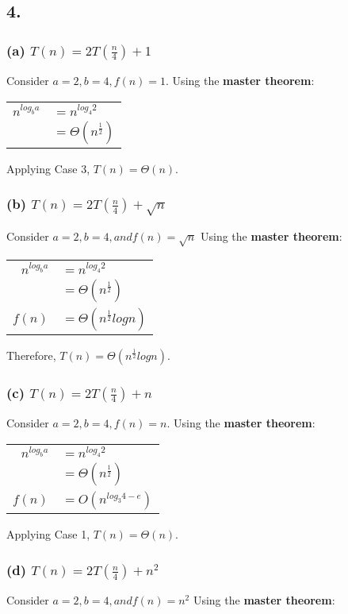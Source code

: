 \documentclass[11pt,letterpaper]{article}
\begin{document}
\subsection*{4.}
\subsubsection*{(a) $T(n) = 2T(\frac{n}{4}) + 1$}
Consider $a = 2, b = 4, f(n) = 1$. Using the \textbf{master theorem}:

\begin{tabular}{r l}
	$n^{ log_b a }$		&	$ = n^{log_4 2} $\\
					&	$ = \Theta(n^{\frac{1}{2}} ) $ \\
\end{tabular}

Applying Case 3, $T(n) = \Theta(n)$.


\subsubsection*{(b) $T(n) = 2T(\frac{n}{4}) + \sqrt{n} $}
Consider $a = 2, b = 4, and f(n) = \sqrt{n} $ Using the \textbf{master theorem}:

\begin{tabular}{r l}
	$n^{ log_b a }$		&	$ = n^{log_4 2} $\\
					&	$ = \Theta(n^{\frac{1}{2}} ) $ \\
	$f(n)$			&	$ = \Theta(n^{\frac{1}{2}} log n) $ \\
\end{tabular}

Therefore, $T(n) = \Theta(n^{\frac{1}{2}} log n) $.


\subsubsection*{(c) $T(n) = 2T(\frac{n}{4}) + n$ }
Consider $a = 2, b = 4, f(n) = n$. Using the \textbf{master theorem}:

\begin{tabular}{r l}
	$n^{ log_b a }$		&	$ = n^{log_4 2} $\\
					&	$ = \Theta(n^{\frac{1}{2}} ) $ \\
	$f(n)$			&	$ = O(n^{log_3 4 - e}) $ \\
\end{tabular}

Applying Case 1, $T(n) = \Theta(n)$.


\subsubsection*{(d) $T(n) = 2T(\frac{n}{4}) + n^2$ }
Consider $a = 2, b = 4, and f(n) = n^2 $ Using the \textbf{master theorem}:
\end{document}
